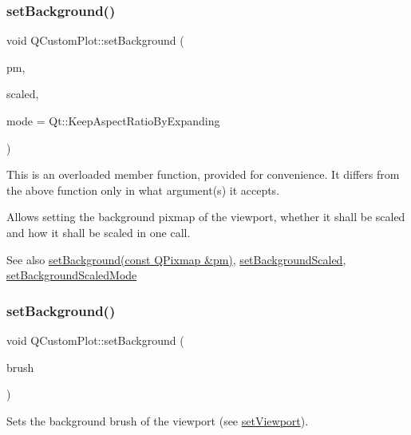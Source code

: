\subsubsection{\texorpdfstring{set\+Background()}{setBackground()}\hspace{0.1cm}{\footnotesize\ttfamily [2/3]}}
{\footnotesize\ttfamily void Q\+Custom\+Plot\+::set\+Background (\begin{DoxyParamCaption}\item[{const Q\+Pixmap \&}]{pm,  }\item[{bool}]{scaled,  }\item[{Qt\+::\+Aspect\+Ratio\+Mode}]{mode = {\ttfamily Qt\+:\+:KeepAspectRatioByExpanding} }\end{DoxyParamCaption})}

This is an overloaded member function, provided for convenience. It differs from the above function only in what argument(s) it accepts.

Allows setting the background pixmap of the viewport, whether it shall be scaled and how it shall be scaled in one call.

\begin{DoxySeeAlso}{See also}
\hyperlink{classQCustomPlot_a130358592cfca353ff3cf5571b49fb00}{set\+Background(const Q\+Pixmap \&pm)}, \hyperlink{classQCustomPlot_a36f0fa1317325dc7b7efea615ee2de1f}{set\+Background\+Scaled}, \hyperlink{classQCustomPlot_a4c0eb4865b7949f62e1cb97db04a3de0}{set\+Background\+Scaled\+Mode} 
\end{DoxySeeAlso}
\mbox{\label{classQCustomPlot_a8ed256cf467bfa7ba1f9feaae62c3bd0}} 
\subsubsection{\texorpdfstring{set\+Background()}{setBackground()}\hspace{0.1cm}{\footnotesize\ttfamily [3/3]}}
{\footnotesize\ttfamily void Q\+Custom\+Plot\+::set\+Background (\begin{DoxyParamCaption}\item[{const Q\+Brush \&}]{brush }\end{DoxyParamCaption})}

Sets the background brush of the viewport (see \hyperlink{classQCustomPlot_a3f9bc4b939dd8aaba9339fd09f273fc4}{set\+Viewport}).

